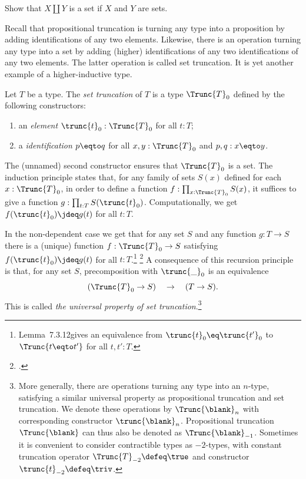 \begin{xca}\label{xca:set-sum}
Show that $X\amalg Y$ is a set if $X$ and $Y$ are sets.
\end{xca}

Recall that propositional truncation is turning any type into
a proposition by adding identifications of any two elements.
Likewise, there is an operation turning any type into a set
by adding (higher) identifications of any two identifications
of any two elements. The latter operation is called set truncation.
It is yet another example of a higher-inductive type.

\begin{definition}\label{def:set-truncation}
Let $T$ be a type. The \emph{set truncation} of $T$
is a type  $\Trunc{T}_0$ defined by the following constructors:
\begin{enumerate}
\item an \emph{element} $\trunc{t}_0 : \Trunc{T}_0$ for all $t:T$;
\item a \emph{identification} $p \eqto q$ for all $x,y:\Trunc{T}_0$ and $p,q: x \eqto y$.
\end{enumerate}
The (unnamed) second constructor ensures that $\Trunc{T}_0$ is a
set. The induction principle states that,
for any family of sets $S(x)$ defined for each $x:\Trunc{T}_0$,
in order to define a function $f:\prod_{x:\Trunc{T}_0} S(x)$,
it suffices to give a function $g: \prod_{t:T} S(\trunc{t}_0)$.
Computationally, we get $f(\trunc{t}_0)\jdeq g(t)$ for all $t:T$.
\end{definition}

In the non-dependent case we get that for any set $S$ and
any function $g: T\to S$ there is a (unique) function $f:\Trunc{T}_0\to S$
satisfying $f(\trunc{t}_0)\jdeq g(t)$ for all $t:T$.\footnote{%
Lemma~7.3.12\footnotemark gives an equivalence from
$\trunc{t}_0 \eq \trunc{t'}_0$ to $\Trunc{t \eqto t'}$ for all $t,t':T$.}%
\footcitetext{hottbook}
A consequence of this recursion principle is that,
for any set $S$, precomposition with $\trunc{\_}_0$ is an equivalence
\[
(\Trunc{T}_0 \to S) \quad \to \quad (T \to S).
\]
This is called \emph{the universal property of set truncation}.\footnote{%
More generally, there are operations turning any type into an $n$-type,
satisfying a similar universal property as propositional truncation
and set truncation. We denote these operations
by $\Trunc{\blank}_n$ with corresponding constructor $\trunc{\blank}_n$.
Propositional truncation $\Trunc{\blank}$ can thus also be denoted as
$\Trunc{\blank}_{-1}$. Sometimes it is convenient to consider
contractible types as $-2$-types, with constant truncation operator
$\Trunc{T}_{-2}\defeq\true$ and
constructor $\trunc{t}_{-2}\defeq\triv$.
}%

